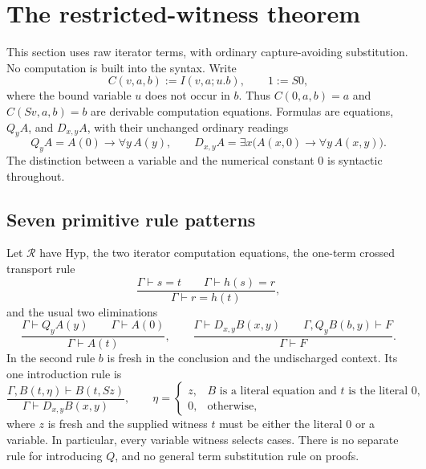 \section{The restricted-witness theorem}
\label{sec:restricted-witness}

This section uses raw iterator terms, with ordinary capture-avoiding
substitution.  No computation is built into the syntax.  Write
\[
 C(v,a,b):=I(v,a;u.b),\qquad 1:=S0,
\]
where the bound variable $u$ does not occur in $b$.  Thus
$C(0,a,b)=a$ and $C(Sv,a,b)=b$ are derivable computation equations.
Formulas are equations, $Q_y A$, and $D_{x,y}A$, with their unchanged
ordinary readings
\[
 Q_yA=A(0)\to\forall y\,A(y),\qquad
 D_{x,y}A=\exists x\bigl(A(x,0)\to\forall y\,A(x,y)\bigr).
\]
The distinction between a variable and the numerical constant $0$ is
syntactic throughout.

\subsection{Seven primitive rule patterns}

Let $\mathcal R$ have Hyp, the two iterator computation equations, the
one-term crossed transport rule
\[
 \frac{\Gamma\vdash s=t\qquad\Gamma\vdash h(s)=r}
      {\Gamma\vdash r=h(t)},
\]
and the usual two eliminations
\[
 \frac{\Gamma\vdash Q_yA(y)\qquad\Gamma\vdash A(0)}
      {\Gamma\vdash A(t)},
 \qquad
 \frac{\Gamma\vdash D_{x,y}B(x,y)\qquad
       \Gamma,Q_yB(b,y)\vdash F}
      {\Gamma\vdash F}.
\]
In the second rule $b$ is fresh in the conclusion and the undischarged
context.  Its one introduction rule is
\[
 \frac{\Gamma,B(t,\eta)\vdash B(t,Sz)}
      {\Gamma\vdash D_{x,y}B(x,y)},
 \qquad
 \eta=\begin{cases}
 z,&B\text{ is a literal equation and }t\text{ is the literal }0,\\
 0,&\text{otherwise},
 \end{cases}
 \tag{RDI}
\]
where $z$ is fresh and the supplied witness $t$ must be either the literal
$0$ or a variable.  In particular, every variable witness selects cases.
There is no separate rule for introducing $Q$, and no general term
substitution rule on proofs.

